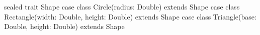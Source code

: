 sealed trait Shape
case class Circle(radius: Double) extends Shape
case class Rectangle(width: Double, height: Double) extends Shape
case class Triangle(base: Double, height: Double) extends Shape